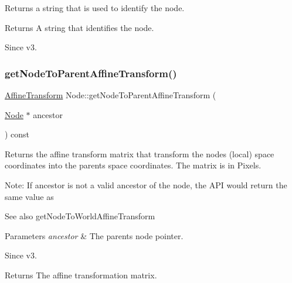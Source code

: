 Returns a string that is used to identify the node. \begin{DoxyReturn}{Returns}
A string that identifies the node.
\end{DoxyReturn}
\begin{DoxySince}{Since}
v3. 
\end{DoxySince}
\mbox{\label{classNode_a72a4d15c717622a50adb468ccc7fad2f}} 
\subsubsection{\texorpdfstring{get\+Node\+To\+Parent\+Affine\+Transform()}{getNodeToParentAffineTransform()}\hspace{0.1cm}{\footnotesize\ttfamily [1/2]}}
{\footnotesize\ttfamily \hyperlink{structAffineTransform}{Affine\+Transform} Node\+::get\+Node\+To\+Parent\+Affine\+Transform (\begin{DoxyParamCaption}\item[{\hyperlink{classNode}{Node} $\ast$}]{ancestor }\end{DoxyParamCaption}) const\hspace{0.3cm}{\ttfamily [virtual]}}

Returns the affine transform matrix that transform the node\textquotesingle{}s (local) space coordinates into the parent\textquotesingle{}s space coordinates. The matrix is in Pixels.

Note\+: If ancestor is not a valid ancestor of the node, the A\+PI would return the same value as \begin{DoxySeeAlso}{See also}
get\+Node\+To\+World\+Affine\+Transform
\end{DoxySeeAlso}

\begin{DoxyParams}{Parameters}
{\em ancestor} & The parent\textquotesingle{}s node pointer. \\
\hline
\end{DoxyParams}
\begin{DoxySince}{Since}
v3. 
\end{DoxySince}
\begin{DoxyReturn}{Returns}
The affine transformation matrix. 
\end{DoxyReturn}
\mbox{\label{classNode_a960eb7e75a7c955eba0ba13e51f825ea}} 
